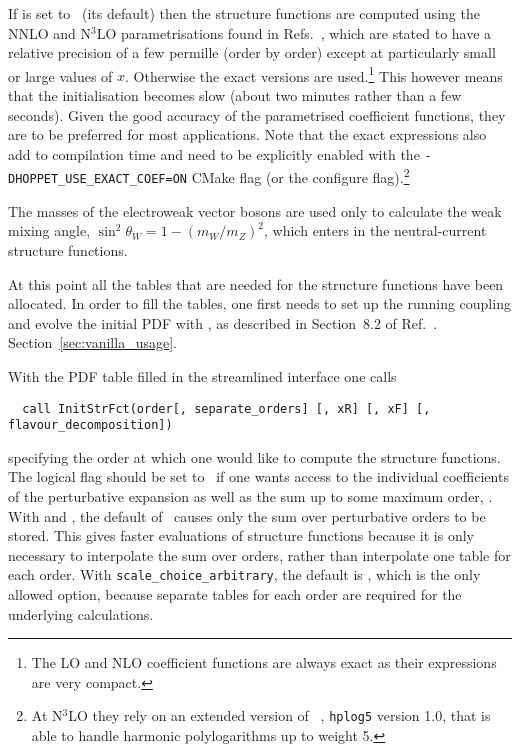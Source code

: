 If  is set to \ (its default) then the
structure functions are computed using the NNLO and N$^3$LO
parametrisations found in
Refs.~\cite{vanNeerven:1999ca,vanNeerven:2000uj,Moch:2004xu,Vermaseren:2005qc,Moch:2008fj,Davies:2016ruz},
which are stated to have a relative precision of a few permille (order
by order) except at particularly small or large values of $x$.
%
Otherwise
the exact versions are used.\footnote{The LO and NLO coefficient
functions are always exact as their expressions are very
compact.}
%
This however means that the initialisation becomes slow (about two
minutes rather than a few seconds).
%
Given the good accuracy of the parametrised coefficient functions,
they are to be preferred for most applications.
% 
% 
Note that the exact expressions also add to compilation time and need
to be explicitly enabled with the \texttt{-DHOPPET\_USE\_EXACT\_COEF=ON}
CMake flag (or the  configure
flag).\footnote{At N$^3$LO they rely on an extended version of
  ~\cite{FortranPolyLog}, \texttt{hplog5} version 1.0, that
  is able to handle harmonic polylogarithms up to weight 5.}

The masses of the electroweak vector bosons are used only to calculate
the weak mixing angle, $\sin^2 \theta_W = 1 - (m_W/m_Z)^2$, which
enters in the neutral-current structure functions.

At this point all the tables that are needed for the structure
functions have been allocated.
%
In order to fill the tables, one first needs to set up the running
coupling and evolve the initial PDF with , as
described in
\ifreleasenote
Section~8.2 of Ref.~\cite{Salam:2008qg}.
\else
Section~\ref{sec:vanilla_usage}.
\fi

%
%
With the PDF table filled in the streamlined interface one calls
\begin{lstlisting}
  call InitStrFct(order[, separate_orders] [, xR] [, xF] [, flavour_decomposition])
\end{lstlisting}
specifying the order at which one would like to compute the structure
functions.
%
The logical flag  should be set to \ if one
wants access to the individual coefficients of the perturbative
expansion as well as the sum up to some maximum order, .
%
With  and , the
default of \ causes only the sum over perturbative orders
to be stored.
%
This gives faster evaluations of structure functions because it is
only necessary to interpolate the sum over orders, rather than
interpolate one table for each order.
%
With \texttt{scale\_choice\_arbitrary}, the default is ,
which is the only allowed option, because separate tables for each
order are required for the underlying calculations.

